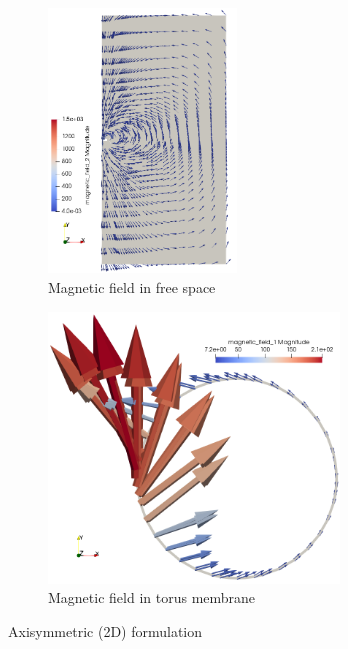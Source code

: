 \documentclass[11pt,a4paper,final]{article}
\begin{document}
\begin{figure}[h]
\centering
\begin{subfigure}{0.49\textwidth}
\centering
\includegraphics[width=0.55\textwidth]{2d_free_space.png}
\caption{Magnetic field in free space}
\label{fig:1.6.1}
\end{subfigure}
\begin{subfigure}{0.49\textwidth}
\centering
\includegraphics[width=0.85\textwidth]{2d_toroid_field_2.png}
\caption{Magnetic field in torus membrane}
\label{fig:1.6.2}
\end{subfigure}
\caption{Axisymmetric (2D) formulation}
\label{fig:1.6}
\end{figure}
\end{document}

